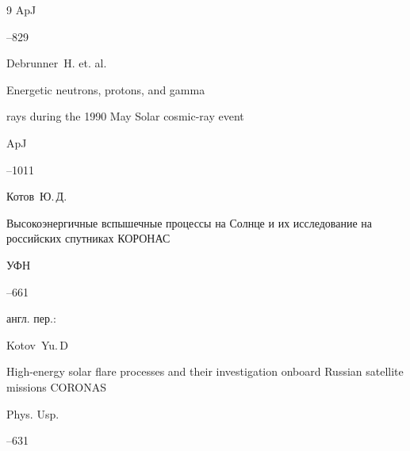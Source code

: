 \begin{thebibliography}{9}
\jour ApJ


--829








\by Debrunner~H. et. al.

\paper Energetic neutrons, protons, and gamma

 rays during the 1990 May Solar cosmic-ray event

\jour ApJ




--1011 





\by Котов~Ю.\,Д.

\paper Высокоэнергичные вспышечные процессы на Солнце и их исследование на российских спутниках КОРОНАС

\jour УФН




--661


\transl англ. пер.:~ 

\by  Kotov~Yu.\,D 

\paper High-energy solar flare processes and their investigation onboard Russian satellite missions CORONAS

\jour Phys. Usp. 



–631 





\end{thebibliography}







\hskip6.5cm \thedate \par

\hskip6.5cm\therevdate\par



\vspace{-10mm}





\makeengtitle



\renewcommand{\baselinestretch}{0.9}



%

